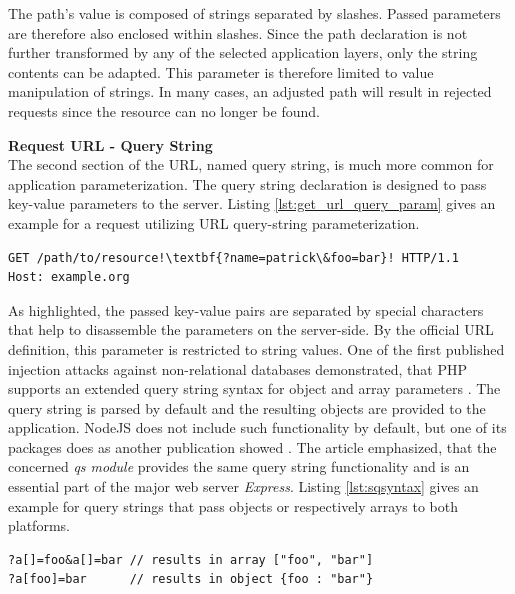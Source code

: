  The path's value is composed of strings separated by slashes. Passed parameters are therefore also enclosed within slashes. Since the path declaration is not further transformed by any of the selected application layers, only the string contents can be adapted. This parameter is therefore limited to value manipulation of strings. In many cases, an adjusted path will result in rejected requests since the resource can no longer be found.

\textbf{Request URL - Query String}\\
The second section of the URL, named query string, is much more common for application parameterization. The query string declaration is designed to pass key-value parameters to the server. Listing \ref{lst:get_url_query_param} gives an example for a request utilizing URL query-string parameterization. \\

\begin{lstlisting}[escapechar=!, caption={Example for GET request with URL query parameterization}, label={lst:get_url_query_param}]
GET /path/to/resource!\textbf{?name=patrick\&foo=bar}! HTTP/1.1
Host: example.org
\end{lstlisting}

As highlighted, the passed key-value pairs are separated by special characters that help to disassemble the parameters on the server-side. By the official URL definition, this parameter is restricted to string values. One of the first published injection attacks against non-relational databases demonstrated, that PHP supports an extended query string syntax for object and array parameters \cite{Sullivan:2011}. The query string is parsed by default and the resulting objects are provided to the application. NodeJS does not include such functionality by default, but one of its packages does as another publication showed \cite{Petkov:2014a}. The article emphasized, that the concerned \textit{qs module} provides the same query string functionality and is an essential part of the major web server \textit{Express}. Listing \ref{lst:sqsyntax} gives an example for query strings that pass objects or respectively arrays to both platforms. \\

\begin{lstlisting}[caption={Examples for extended query string syntax}, label={lst:sqsyntax}]
?a[]=foo&a[]=bar // results in array ["foo", "bar"]
?a[foo]=bar      // results in object {foo : "bar"}
\end{lstlisting}

